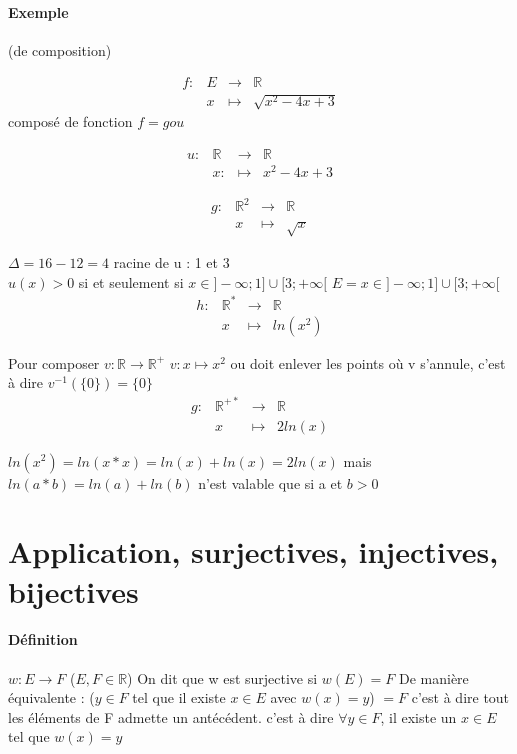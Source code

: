 \paragraph{Exemple} (de composition)

\begin{align*}
	f: & E & \rightarrow & \mathbb{R} \\
	& x & \mapsto & \sqrt{x^2 - 4x + 3}
\end{align*}
composé de fonction $f=gou$

\begin{align*}
	u : & \mathbb{R} & \rightarrow & \mathbb{R} \\
	\text{} & x : & \mapsto & x^2-4x+3
\end{align*}

\begin{align*}
	g : & \mathbb{R}^2 & \rightarrow & \mathbb{R} \\
	 & x & \mapsto & \sqrt{x}
\end{align*}

$\Delta = 16 - 12 = 4$
racine de u : 1 et 3
~\\

$u(x) > 0$ si et seulement si $ x \in ]-\infty; 1] \cup [3; +\infty[$
$E = x \in ]-\infty; 1] \cup [3; +\infty[$
~\\

\begin{align*}
	h : & \mathbb{R}^* & \rightarrow & \mathbb{R} \\
		& x & \mapsto & ln(x^2)
\end{align*}

Pour composer $v : \mathbb{R} \rightarrow \mathbb{R}^+$
$v : x \mapsto x^2$ ou doit enlever les points où v s'annule, c'est à dire $v^{-1}(\{0\}) = \{0\}$
~\\

\begin{align*}
g : &  \mathbb{R}^{+*} & \rightarrow & \mathbb{R} \\
	   & x & \mapsto & 2ln(x)
\end{align*}

$ln(x^2) = ln(x*x) = ln(x) + ln(x) = 2ln(x)$
mais $ln(a*b) = ln(a) + ln(b)$ n'est valable que si a et $b > 0$

\section{Application, surjectives, injectives, bijectives}
\paragraph{Définition} $w : E \rightarrow F$ ($E, F \in \mathbb{R}$)
On dit que w est surjective si $w(E) = F$
De manière équivalente : ($y \in F$ tel que il existe $x \in E$ avec $w(x) = y$) $= F$ c'est à dire tout les éléments de F admette un antécédent.
c'est à dire $ \forall y \in F$, il existe un $x \in E$ tel que $w(x) = y$

